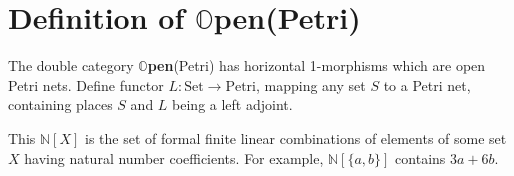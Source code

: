 \documentclass[utf8,british]{cms-essay}
\newcommand{\open}{\textbf{$\mathds{O}$pen}(Petri) }
\begin{document}




\section{Definition of \open}
\label{sec:open}
The double category \open has horizontal 1-morphisms which are open Petri nets. Define functor $L: \mathrm{Set} \rightarrow \mathrm{Petri}$, mapping any set $S$ to a Petri net, containing places $S$ and $L$ being a left adjoint.



This $\mathds{N}[X]$ is the set of formal finite linear combinations of elements of some set $X$ having natural number coefficients. For example, $\mathds{N}[\{a,b\}]$ contains $3a + 6b$.
\end{document}

